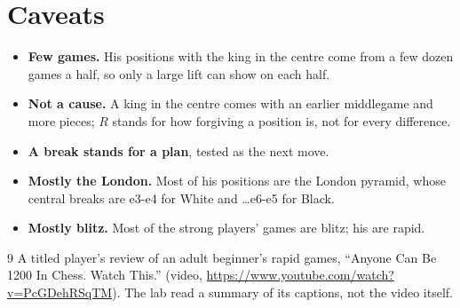 \documentclass[11pt]{article}
\begin{document}
\section{Caveats}

\begin{itemize}[nosep]
\item \textbf{Few games.} His positions with the king in the centre come from a few dozen games a
  half, so only a large lift can show on each half.
\item \textbf{Not a cause.} A king in the centre comes with an earlier middlegame and more pieces;
  $R$ stands for how forgiving a position is, not for every difference.
\item \textbf{A break stands for a plan}, tested as the next move.
\item \textbf{Mostly the London.} Most of his positions are the London pyramid, whose central
  breaks are e3-e4 for White and \ldots e6-e5 for Black.
\item \textbf{Mostly blitz.} Most of the strong players' games are blitz; his are rapid.
\end{itemize}

\begin{thebibliography}{9}
 A titled player's review of an adult beginner's rapid games, ``Anyone Can Be 1200
  In Chess. Watch This.'' (video, \url{https://www.youtube.com/watch?v=PcGDehRSqTM}). The lab read
  a summary of its captions, not the video itself.
\end{thebibliography}
\end{document}

